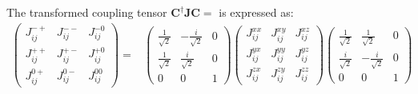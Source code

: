 The transformed coupling tensor $\mathbf{C}^{\dagger} \mathbf{J} \mathbf{C} = $ is expressed as:
\begin{equation}
    \begin{split}
    \begin{pmatrix}
        J^{-+}_{ij} & J^{--}_{ij} & J^{-0}_{ij} \\[0.3em]
        J^{++}_{ij} & J^{+-}_{ij} & J^{+0}_{ij} \\[0.3em]
        J^{0+}_{ij} & J^{0-}_{ij} & J^{00}_{ij}
    \end{pmatrix}
    = &
    \begin{pmatrix}
        \frac{1}{\sqrt{2}}   & - \frac{i}{\sqrt{2}}   &   0   \\[0.3em]
        \frac{1}{\sqrt{2}}   &   \frac{i}{\sqrt{2}}   &   0   \\[0.3em]
                0     &         0       &   1   
    \end{pmatrix} 
    \begin{pmatrix}
        J^{xx}_{ij}   &   J^{xy}_{ij}   &   J^{xz}_{ij}   \\[0.3em]
        J^{yx}_{ij}   &   J^{yy}_{ij}   &   J^{yz}_{ij}   \\[0.3em]
        J^{zx}_{ij}   &   J^{zy}_{ij}   &   J^{zz}_{ij}   
    \end{pmatrix}
    \begin{pmatrix}
        \frac{1}{\sqrt{2}}   &   \frac{1}{\sqrt{2}}   &   0   \\[0.3em]
        \frac{i}{\sqrt{2}}   & - \frac{i}{\sqrt{2}}   &   0   \\[0.3em]
                0     &         0       &   1   
    \end{pmatrix} 
    \end{split}
\end{equation}
